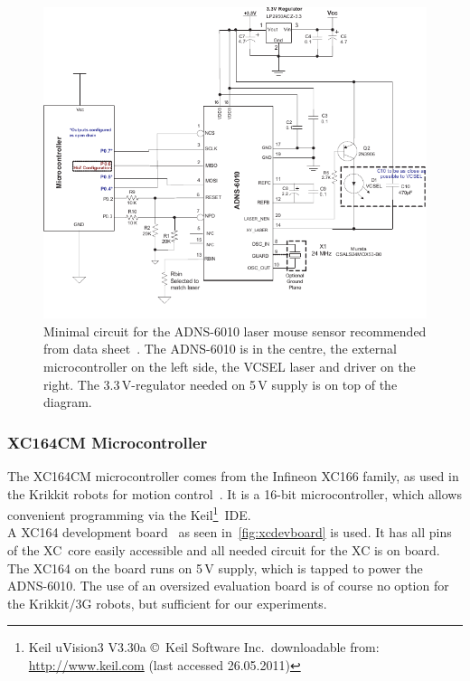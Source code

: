 \documentclass[12pt,a4paper]{article}
\begin{document}
\begin{figure}[htbp]
\begin{center}  
\includegraphics[width=1\columnwidth]{figures/adnsc}
\caption{\label{fig:adnsc}
Minimal circuit for the ADNS-6010 laser mouse sensor recommended from data sheet~\cite{adns}.
The ADNS-6010 is in the centre, the external microcontroller on the left side, the VCSEL laser and driver on the right.
The 3.3\,V-regulator needed on 5\,V supply is on top of the diagram.
}   
\end{center}
\end{figure}


\subsubsection{XC164CM Microcontroller}

The XC164CM microcontroller comes from the Infineon XC166 family, as used in the Krikkit robots for motion control~\cite{krammer07}.
It is a 16-bit microcontroller, which allows convenient programming via the Keil\footnote{Keil uVision3 V3.30a \copyright~Keil Software Inc.\ downloadable from: \url{http://www.keil.com} (last accessed 26.05.2011)}~IDE.\\
A XC164 development board~\cite{xc} as seen in~\autoref{fig:xcdevboard} is used. 
It has all pins of the XC~core easily accessible and all needed circuit for the XC is on board.
The XC164 on the board runs on 5\,V supply, which is tapped to power the ADNS-6010.
The use of an oversized evaluation board is of course no option for the Krikkit/3G robots, but sufficient for our experiments.
\end{document}
